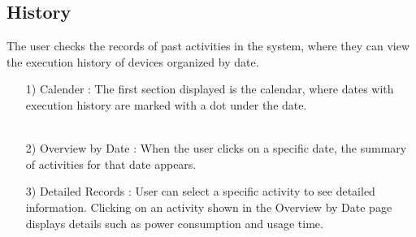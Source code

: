 \documentclass[conference]{IEEEtran}
\begin{document}
\subsection{History}
The user checks the records of past activities in the system, where they can view the execution history of devices organized by date. \\
\begin{enumerate}
    \begin{figure}[h]
\hspace{1.5cm}
\centering
\begin{minipage}{0.4\columnwidth}
    \texttt{[image: img/Usecase/Calender.png]}
    \caption{Calender}
\end{minipage}
\end{figure}
    \item [1)] Calender : The first section displayed is the calendar, where dates with execution history are marked with a dot under the date.  \\ \\ 
\end{enumerate}

\begin{enumerate}
    \begin{figure}[h]
\hspace{1.5cm}
\centering
\begin{minipage}{0.4\columnwidth}
    \texttt{[image: img/Usecase/Overview by Date.png]}
    \caption{Overview \\ By Date}
\end{minipage}
\end{figure}
    \item [2)] Overview by Date : When the user clicks on a specific date, the summary of activities for that date appears. \\
\end{enumerate}

\begin{enumerate}
    \begin{figure}[h]
\hspace{1.5cm}
\centering
\begin{minipage}{0.4\columnwidth}
    \texttt{[image: img/Usecase/Detailed Records.png]}
    \caption{\\ Detailed Record}
\end{minipage}
\end{figure}
    \item [3)] Detailed Records : User can select a specific activity to see detailed information. Clicking on an activity shown in the Overview by Date page displays details such as power consumption and usage time.
\end{enumerate}
\end{document}
